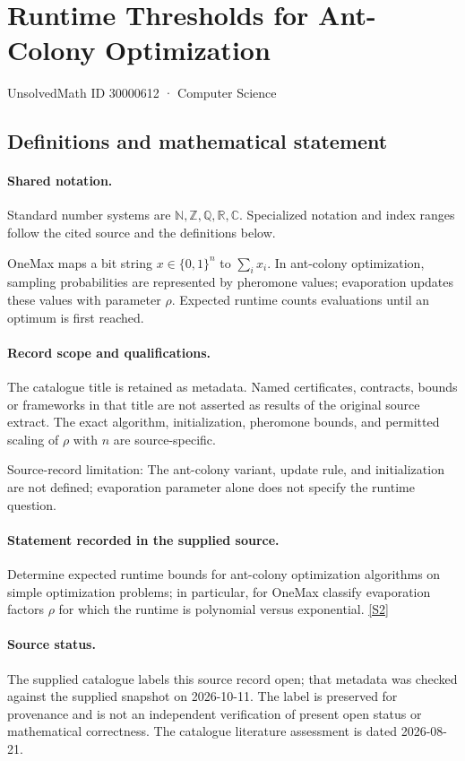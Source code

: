 \documentclass[11pt]{article}
\newcommand{\sref}[2]{\hyperlink{source:#1:#2}{[S#2]}}
\begin{document}
\setcounter{section}{30000611}
\section{Runtime Thresholds for Ant-Colony Optimization}\label{30000612}
{\small\sffamily UnsolvedMath ID 30000612 · Computer Science}
\subsection{Definitions and mathematical statement}

\paragraph{Shared notation.}Standard number systems are $\mathbb N,\mathbb Z,\mathbb Q,\mathbb R,\mathbb C$. Specialized notation and index ranges follow the cited source and the definitions below.


OneMax maps a bit string $x\in\{0,1\}^n$ to $\sum_i x_i$. In ant-colony optimization, sampling probabilities are represented by pheromone values; evaporation updates these values with parameter $\rho$. Expected runtime counts evaluations until an optimum is first reached.
\paragraph{Record scope and qualifications.}
The catalogue title is retained as metadata. Named certificates, contracts, bounds or frameworks in that title are not asserted as results of the original source extract.
The exact algorithm, initialization, pheromone bounds, and permitted scaling of $\rho$ with $n$ are source-specific.

Source-record limitation: The ant-colony variant, update rule, and initialization are not defined; evaporation parameter alone does not specify the runtime question.
\paragraph{Statement recorded in the supplied source.}
Determine expected runtime bounds for ant-colony optimization algorithms on simple optimization problems; in particular, for OneMax classify evaporation factors $\rho$ for which the runtime is polynomial versus exponential. \sref{30000612}{2}
\paragraph{Source status.}
The supplied catalogue labels this source record open; that metadata was checked against the supplied snapshot on 2026-10-11. The label is preserved for provenance and is not an independent verification of present open status or mathematical correctness. The catalogue literature assessment is dated 2026-08-21.
\end{document}
